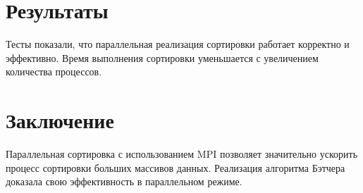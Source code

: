 \documentclass[12pt]{article}
\begin{document}
\section{Результаты}
Тесты показали, что параллельная реализация сортировки работает корректно и эффективно. Время выполнения сортировки уменьшается с увеличением количества процессов.

\section{Заключение}
Параллельная сортировка с использованием MPI позволяет значительно ускорить процесс сортировки больших массивов данных. Реализация алгоритма Бэтчера доказала свою эффективность в параллельном режиме.
\end{document}
